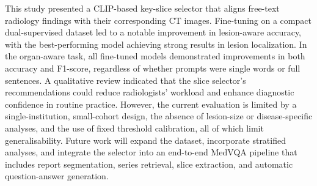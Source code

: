 \documentclass[bioengineering,article,submit,pdftex,moreauthors]{Definitions/mdpi}
\begin{document}
This study presented a CLIP-based key-slice selector that aligns free-text radiology findings with their corresponding CT images. Fine-tuning on a compact dual-supervised dataset led to a notable improvement in lesion-aware accuracy, with the best-performing model achieving strong results in lesion localization. In the organ-aware task, all fine-tuned models demonstrated improvements in both accuracy and F1-score, regardless of whether prompts were single words or full sentences. A qualitative review indicated that the slice selector’s recommendations could reduce radiologists’ workload and enhance diagnostic confidence in routine practice. However, the current evaluation is limited by a single-institution, small-cohort design, the absence of lesion-size or disease-specific analyses, and the use of fixed threshold calibration, all of which limit generalisability. Future work will expand the dataset, incorporate stratified analyses, and integrate the selector into an end-to-end MedVQA pipeline that includes report segmentation, series retrieval, slice extraction, and automatic question-answer generation.

\vspace{6pt} 




\end{document}
